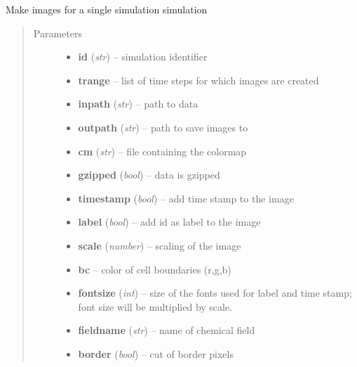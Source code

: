 \documentclass[letterpaper,10pt,english]{sphinxmanual}
\begin{document}
\begin{fulllineitems}
\label{CC3DPipeline:CC3DPipeline.makeImages}
Make images for a single simulation simulation
\begin{quote}\begin{description}
\item[{Parameters}] \leavevmode\begin{itemize}
\item {} 
\textbf{id} (\emph{str}) -- simulation identifier

\item {} 
\textbf{trange} -- list of time steps for which images are created

\item {} 
\textbf{inpath} (\emph{str}) -- path to data

\item {} 
\textbf{outpath} (\emph{str}) -- path to save images to

\item {} 
\textbf{cm} (\emph{str}) -- file containing the colormap

\item {} 
\textbf{gzipped} (\emph{bool}) -- data is gzipped

\item {} 
\textbf{timestamp} (\emph{bool}) -- add time stamp to the image

\item {} 
\textbf{label} (\emph{bool}) -- add id as label to the image

\item {} 
\textbf{scale} (\emph{number}) -- scaling of the image

\item {} 
\textbf{bc} -- color of cell boundaries (r,g,b)

\item {} 
\textbf{fontsize} (\emph{int}) -- size of the fonts used for label and time stamp; font size will be multiplied by scale.

\item {} 
\textbf{fieldname} (\emph{str}) -- name of chemical field

\item {} 
\textbf{border} (\emph{bool}) -- cut of border pixels

\end{itemize}

\end{description}\end{quote}




{\hyperref[ImageUtils:ImageUtils.makeImage]{}}



\end{fulllineitems}
\end{document}
